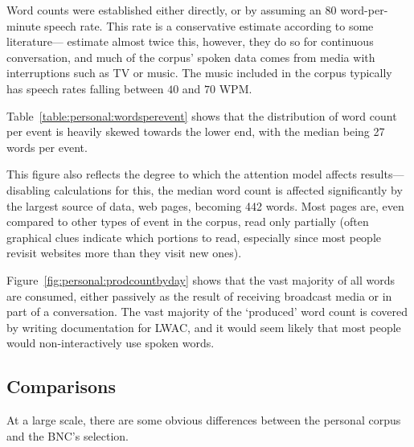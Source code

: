 Word counts were established either directly, or by assuming an 80 word-per-minute speech rate.  This rate is a conservative estimate according to some literature---\cite{yuan2006towards} estimate almost twice this, however, they do so for continuous conversation, and much of the corpus' spoken data comes from media with interruptions such as TV or music.  The music included in the corpus typically has speech rates falling between $40$ and $70$ WPM.  

Table~\ref{table:personal:wordsperevent} shows that the distribution of word count per event is heavily skewed towards the lower end, with the median being 27 words per event.

This figure also reflects the degree to which the attention model affects results---disabling calculations for this, the median word count is affected significantly by the largest source of data, web pages, becoming 442 words.  Most pages are, even compared to other types of event in the corpus, read only partially (often graphical clues indicate which portions to read, especially since most people revisit websites more than they visit new ones).

Figure~\ref{fig:personal:prodcountbyday} shows that the vast majority of all words are consumed, either passively as the result of receiving broadcast media or in part of a conversation.  The vast majority of the `produced' word count is covered by writing documentation for LWAC, and it would seem likely that most people would non-interactively use spoken words.




\FloatBarrier




\subsection{Comparisons}



At a large scale, there are some obvious differences between the personal corpus and the BNC's selection.

